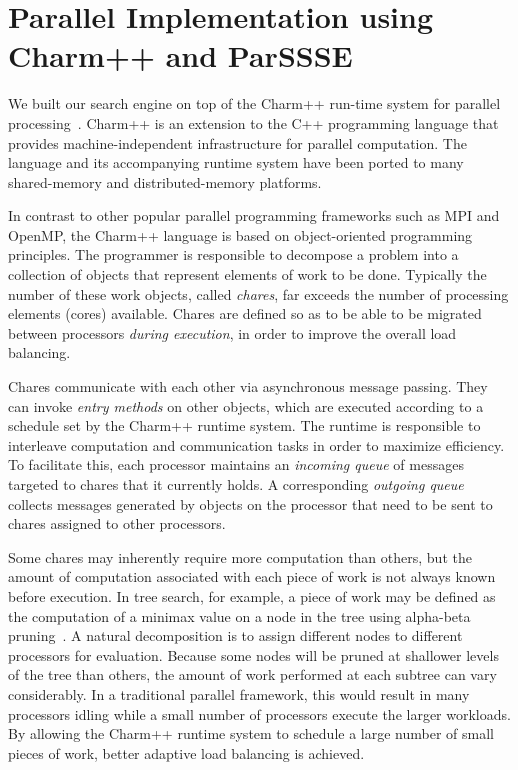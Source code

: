 \documentclass[10pt, conference, compsocconf]{IEEEtran}
\begin{document}
\section{Parallel Implementation using Charm++ and ParSSSE}\label{ParSSSE}
We built our search engine on top of the {\sc Charm++} run-time
system for parallel processing~\cite{kale93charm,kale09charm}.  {\sc Charm++}
is an extension to the C++ programming language that provides
machine-independent infrastructure for parallel computation.  The language and
its accompanying runtime system have been ported to many shared-memory and
distributed-memory platforms.

In contrast to other popular parallel programming frameworks such as {\sc MPI}
and {\sc OpenMP}, the {\sc Charm++} language is based on object-oriented
programming principles.  The programmer is responsible to decompose a problem
into a collection of objects that represent elements of work to be done.
Typically the number of these work objects, called {\em chares}, far exceeds
the number of processing elements (cores) available.  Chares are defined
so as to be able to be migrated between processors {\em during execution}, in
order to improve the overall load balancing.  

Chares communicate with each other via
asynchronous message passing.  They can invoke {\em entry methods} on other
objects, which are executed according to a schedule set by the {\sc Charm++}
runtime system.  The runtime is responsible to interleave computation and
communication tasks in order to maximize efficiency.  To facilitate this, each
processor maintains an {\em incoming queue} of messages targeted to chares that
it currently holds.  A corresponding {\em outgoing queue} collects messages
generated by objects on the processor that need to be sent to chares assigned
to other processors.

Some chares may inherently require more computation than others, but the amount
of computation associated with each piece of work is not always known before
execution.  In tree search, for example, a piece of work may be defined as the
computation of a minimax value on a node in the tree using alpha-beta
pruning~\cite{knuth75analysis,baudet78analysis}.  A natural decomposition is to
assign different nodes to different processors for evaluation.  Because some
nodes will be pruned at shallower levels of the tree than others, the amount of
work performed at each subtree can vary considerably.  In a traditional
parallel framework, this would result in many processors idling while a small
number of processors execute the larger workloads. By allowing the {\sc
Charm++} runtime system to schedule a large number of small pieces of work,
better adaptive load balancing is achieved. 
\end{document}
